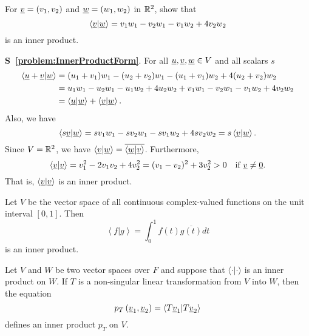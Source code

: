 \begin{problem} \label{problem:InnerProductForm}
For $\underline{v} = (v_1, v_2)$ and $\underline{w} = (w_1, w_2)$  in $\mathbb{R}^2$, show that
\begin{equation*}
\left\langle \underline{v} | \underline{w} \right\rangle
= v_1 w_1 - v_2 w_1 - v_1 w_2 + 4 v_2 w_2
\end{equation*}
is an inner product.
\end{problem}
\textbf{S~\ref{problem:InnerProductForm}}.
For all $\underline{u}, \underline{v}, \underline{w} \in V$ and all scalars $s$
\begin{equation*}
\begin{split}
\left\langle \underline{u} + \underline{v} | \underline{w} \right\rangle
&= (u_1 + v_1) w_1 - (u_2 + v_2) w_1 - (u_1 + v_1) w_2 + 4 (u_2 + v_2) w_2 \\
&= u_1 w_1 - u_2 w_1 - u_1 w_2 + 4 u_2 w_2
+ v_1 w_1 - v_2 w_1 - v_1 w_2 + 4 v_2 w_2 \\
&= \left\langle \underline{u} | \underline{w} \right\rangle
+ \left\langle \underline{v} | \underline{w} \right\rangle.
\end{split}
\end{equation*}
Also, we have
\begin{equation*}
\left\langle s \underline{v} | \underline{w} \right\rangle
= s v_1 w_1 - s v_2 w_1 - s v_1 w_2 + 4 s v_2 w_2
= s \left\langle \underline{v} | \underline{w} \right\rangle.
\end{equation*}
Since $V = \mathbb{R}^2$, we have $\left\langle \underline{v} | \underline{w} \right\rangle = \overline{ \left\langle \underline{w} | \underline{v} \right\rangle }$.
Furthermore,
\begin{equation*}
\left\langle \underline{v} | \underline{v} \right\rangle
= v_1^2 - 2 v_1 v_2 + 4 v_2^2
= ( v_1 - v_2 )^2 + 3 v_2^2
> 0
\quad \text{if } \underline{v} \neq \underline{0}.
\end{equation*}
That is, $\left\langle \underline{v} | \underline{v} \right\rangle$ is an inner product.


\begin{example}
Let $V$ be the vector space of all continuous complex-valued functions on the unit interval $[0,1]$.
Then
\begin{equation*}
\left\langle f | g \right\rangle
= \int_0^1 f(t) \overline{g(t)} dt
\end{equation*}
is an inner product.
\end{example}

\begin{example}
Let $V$ and $W$ be two vector spaces over $F$ and suppose that $\langle \cdot | \cdot \rangle$ is an inner product on $W$.
If $T$ is a non-singular linear transformation from $V$ into $W$, then the equation
\begin{equation*}
p_T \left( \underline{v}_1, \underline{v}_2 \right)
= \left\langle T \underline{v}_1 | T \underline{v}_2 \right\rangle
\end{equation*}
defines an inner product $p_T$ on $V$.
\end{example}

